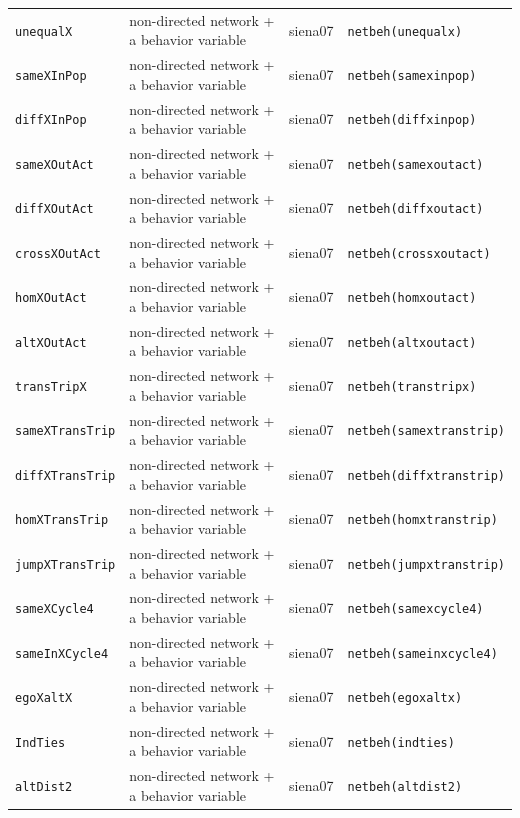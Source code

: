 \begin{longtable}{@{}p{2.6cm}p{3.2cm}p{2.9cm}p{5.4cm}@{}}
\texttt{unequalX} & non-directed network + a behavior variable & siena07 & \texttt{netbeh(unequalx)}\\
\texttt{sameXInPop} & non-directed network + a behavior variable & siena07 & \texttt{netbeh(samexinpop)}\\
\texttt{diffXInPop} & non-directed network + a behavior variable & siena07 & \texttt{netbeh(diffxinpop)}\\
\texttt{sameXOutAct} & non-directed network + a behavior variable & siena07 & \texttt{netbeh(samexoutact)}\\
\texttt{diffXOutAct} & non-directed network + a behavior variable & siena07 & \texttt{netbeh(diffxoutact)}\\
\texttt{crossXOutAct} & non-directed network + a behavior variable & siena07 & \texttt{netbeh(crossxoutact)}\\
\texttt{homXOutAct} & non-directed network + a behavior variable & siena07 & \texttt{netbeh(homxoutact)}\\
\texttt{altXOutAct} & non-directed network + a behavior variable & siena07 & \texttt{netbeh(altxoutact)}\\
\texttt{transTripX} & non-directed network + a behavior variable & siena07 & \texttt{netbeh(transtripx)}\\
\texttt{sameXTransTrip} & non-directed network + a behavior variable & siena07 & \texttt{netbeh(samextranstrip)}\\
\texttt{diffXTransTrip} & non-directed network + a behavior variable & siena07 & \texttt{netbeh(diffxtranstrip)}\\
\texttt{homXTransTrip} & non-directed network + a behavior variable & siena07 & \texttt{netbeh(homxtranstrip)}\\
\texttt{jumpXTransTrip} & non-directed network + a behavior variable & siena07 & \texttt{netbeh(jumpxtranstrip)}\\
\texttt{sameXCycle4} & non-directed network + a behavior variable & siena07 & \texttt{netbeh(samexcycle4)}\\
\texttt{sameInXCycle4} & non-directed network + a behavior variable & siena07 & \texttt{netbeh(sameinxcycle4)}\\
\texttt{egoXaltX} & non-directed network + a behavior variable & siena07 & \texttt{netbeh(egoxaltx)}\\
\texttt{IndTies} & non-directed network + a behavior variable & siena07 & \texttt{netbeh(indties)}\\
\texttt{altDist2} & non-directed network + a behavior variable & siena07 & \texttt{netbeh(altdist2)}\\

\end{longtable}
